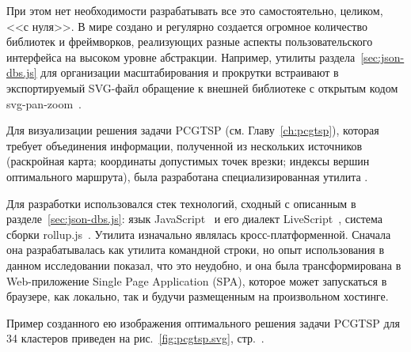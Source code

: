 При этом нет необходимости разрабатывать все это самостоятельно,
целиком, <<с нуля>>.
В мире создано и регулярно создается
огромное количество библиотек и фреймворков,
реализующих разные аспекты пользовательского интерфейса
на высоком уровне абстракции.
Например,
утилиты раздела~\ref{sec:json-dbs.js}
для организации
масштабирования и прокрутки
встраивают в экспортируемый SVG-файл
обращение к внешней
библиотеке с открытым кодом
svg-pan-zoom~\cite{bi:svg-pan-zoom}.

Для визуализации решения задачи PCGTSP
(см. Главу~\ref{ch:pcgtsp}),
которая требует объединения
информации,
полученной из нескольких источников
(раскройная карта;
координаты допустимых точек врезки;
индексы вершин оптимального маршрута),
была разработана специализированная утилита
\cite{bi:j2pcgtsp}.

Для разработки использовался стек технологий,
сходный с описанным в разделе~\ref{sec:json-dbs.js}:
язык JavaScript~\cite{bi:JavaScript}
и его диалект
LiveScript~\cite{bi:LiveScript},
система сборки rollup.js~\cite{bi:rollup.js}.
Утилита изначально являлась кросс-платформенной.
Сначала она разрабатывалась
как утилита командной строки,
но опыт использования в данном исследовании
показал,
что это неудобно,
и она была трансформирована в Web-приложение
Single Page Application
(SPA),
которое может запускаться в браузере,
как локально,
так и будучи размещенным на произвольном хостинге.

Пример созданного ею изображения
оптимального решения задачи PCGTSP
для
34 кластеров
приведен на рис.~\ref{fig:pcgtsp.svg},
стр.~\pageref{fig:pcgtsp.svg}.
